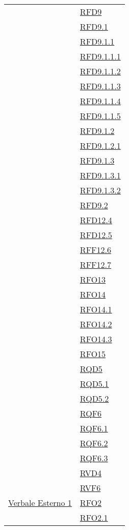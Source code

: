 \begin{longtable}{|>{\centering}m{5cm}|m{5cm}<{\centering}|}
& \hyperlink{RFD9}{RFD9}\\
& \hyperlink{RFD9.1}{RFD9.1}\\
& \hyperlink{RFD9.1.1}{RFD9.1.1}\\
& \hyperlink{RFD9.1.1.1}{RFD9.1.1.1}\\
& \hyperlink{RFD9.1.1.2}{RFD9.1.1.2}\\
& \hyperlink{RFD9.1.1.3}{RFD9.1.1.3}\\
& \hyperlink{RFD9.1.1.4}{RFD9.1.1.4}\\
& \hyperlink{RFD9.1.1.5}{RFD9.1.1.5}\\
& \hyperlink{RFD9.1.2}{RFD9.1.2}\\
& \hyperlink{RFD9.1.2.1}{RFD9.1.2.1}\\
& \hyperlink{RFD9.1.3}{RFD9.1.3}\\
& \hyperlink{RFD9.1.3.1}{RFD9.1.3.1}\\
& \hyperlink{RFD9.1.3.2}{RFD9.1.3.2}\\
& \hyperlink{RFD9.2}{RFD9.2}\\
& \hyperlink{RFD12.4}{RFD12.4}\\
& \hyperlink{RFD12.5}{RFD12.5}\\
& \hyperlink{RFF12.6}{RFF12.6}\\
& \hyperlink{RFF12.7}{RFF12.7}\\
& \hyperlink{RFO13}{RFO13}\\
& \hyperlink{RFO14}{RFO14}\\
& \hyperlink{RFO14.1}{RFO14.1}\\
& \hyperlink{RFO14.2}{RFO14.2}\\
& \hyperlink{RFO14.3}{RFO14.3}\\
& \hyperlink{RFO15}{RFO15}\\
& \hyperlink{RQD5}{RQD5}\\
& \hyperlink{RQD5.1}{RQD5.1}\\
& \hyperlink{RQD5.2}{RQD5.2}\\
& \hyperlink{RQF6}{RQF6}\\
& \hyperlink{RQF6.1}{RQF6.1}\\
& \hyperlink{RQF6.2}{RQF6.2}\\
& \hyperlink{RQF6.3}{RQF6.3}\\
& \hyperlink{RVD4}{RVD4}\\
& \hyperlink{RVF6}{RVF6}\\ \hline
\hyperlink{Verbale Esterno 1}{Verbale Esterno 1} & \hyperlink{RFO2}{RFO2}\\
& \hyperlink{RFO2.1}{RFO2.1}\\

\end{longtable}
